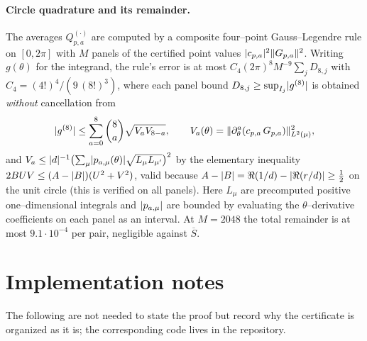 \documentclass[12pt]{article}
\begin{document}
\paragraph{Circle quadrature and its remainder.}
The averages $Q^{(\cdot)}_{p,a}$ are computed by a composite four--point
Gauss--Legendre rule on $[0,2\pi]$ with $M$ panels of the certified point values
$\lvert c_{p,a}\rvert^2\lVert G_{p,a}\rVert^2$.  Writing $g(\theta)$ for the integrand, the
rule's error is at most $C_4(2\pi)^8M^{-9}\sum_j D_{8,j}$ with
$C_4=(4!)^4/(9\,(8!)^3)$, where each panel bound $D_{8,j}\ge\sup_{I_j}\lvert g^{(8)}\rvert$
is obtained \emph{without} cancellation from
\[
   \lvert g^{(8)}\rvert\le\sum_{a=0}^{8}\binom8a\sqrt{V_aV_{8-a}},\qquad
   V_a(\theta)=\lVert\partial_\theta^a(c_{p,a}\,G_{p,a})\rVert_{L^2(\mu)}^2 ,
\]
and $V_a\le\lvert d\rvert^{-1}\bigl(\sum_\mu\lvert p_{a,\mu}(\theta)\rvert\sqrt{L_\mu L_{\mu'}}\bigr)^2$
by the elementary inequality $2BUV\le(A-\lvert B\rvert)(U^2+V^2)$, valid because
$A-\lvert B\rvert=\Re(1/d)-\lvert\Re(r/d)\rvert\ge\tfrac12$ on the unit circle (this is verified
on all panels).  Here $L_\mu$ are precomputed positive one--dimensional integrals
and $\lvert p_{a,\mu}\rvert$ are bounded by evaluating the $\theta$--derivative
coefficients on each panel as an interval.  At $M=2048$ the total remainder is at
most $9.1\cdot10^{-4}$ per pair, negligible against $\overline S$.

\section{Implementation notes}\label{sec:impl}

The following are not needed to state the proof but record why the certificate is
organized as it is; the corresponding code lives in the repository.
\end{document}
